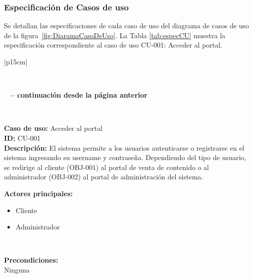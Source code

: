 \newpage
\subsubsection{Especificación de Casos de uso}
Se detallan las especificaciones de cada caso de uso del diagrama de casos de uso de la figura~\ref{fig:DiaramaCasoDeUso}. La Tabla \ref{tab:especCU} muestra la especificación correspondiente al caso de uso CU-001: Acceder al portal.

\renewcommand{\arraystretch}{1.5}
\begin{longtable}{|p{15cm}|}
\caption{Especificación del caso de uso CU-001: Acceder al portal}
\label{tab:especCU}\\
\hline
\endfirsthead

%
{{\bfseries \tablename\ \thetable{} -- continuación desde la página anterior}} \\
\hline
\endhead

\hline {} \\
\endfoot

\hline
\endlastfoot

\textbf{Caso de uso:} Acceder al portal \\
\hline
\textbf{ID:} CU-001 \\
\textbf{Descripción:} El sistema permite a los usuarios autenticarse o registrarse en el sistema ingresando su username y contraseña. Dependiendo del tipo de usuario, se redirige al cliente (OBJ-001) al portal de venta de contenido o al administrador (OBJ-002) al portal de administración del sistema. \\
\hline

\textbf{Actores principales:}
\begin{itemize}
    \item Cliente
    \item Administrador
\end{itemize} \\
\hline

\textbf{Precondiciones:} \\
Ninguna \\
\hline


\end{longtable}
